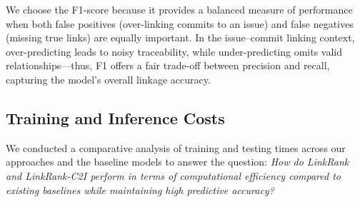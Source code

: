 We choose the F1-score because it provides a balanced measure of performance when both false positives (over-linking commits to an issue) and false negatives (missing true links) are equally important. In the issue--commit linking context, over-predicting leads to noisy traceability, while under-predicting omits valid relationships—thus, F1 offers a fair trade-off between precision and recall, capturing the model’s overall linkage accuracy.







\subsection{Training and Inference Costs}

We conducted a comparative analysis of training and testing times across our approaches and the baseline models to answer the question:
\emph{How do LinkRank and LinkRank-C2I perform in terms of computational efficiency compared to existing baselines while maintaining high predictive accuracy?}\\

